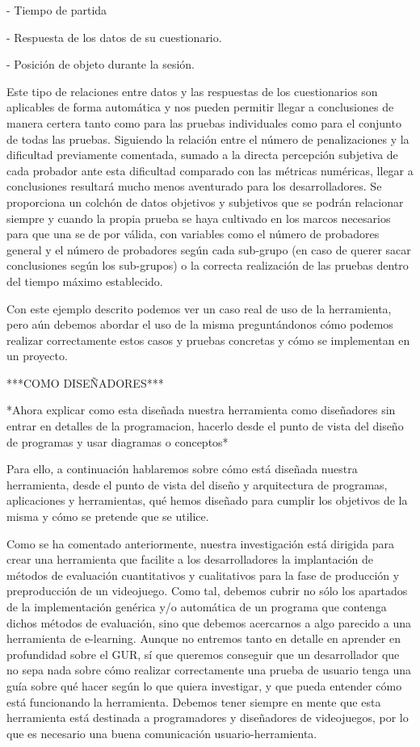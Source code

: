 - Tiempo de partida

- Respuesta de los datos de su cuestionario.

- Posición de objeto durante la sesión.


Este tipo de relaciones entre datos y las respuestas de los cuestionarios son aplicables de forma automática y nos pueden permitir llegar a conclusiones de manera certera tanto como para las pruebas individuales como para el conjunto de todas las pruebas. Siguiendo la relación entre el número de penalizaciones y la dificultad previamente comentada, sumado a la directa percepción subjetiva de cada probador ante esta dificultad comparado con las métricas numéricas, llegar a conclusiones resultará mucho menos aventurado para los desarrolladores. Se proporciona un colchón de datos objetivos y subjetivos que se podrán relacionar siempre y cuando la propia prueba se haya cultivado en los marcos necesarios para que una se de por válida, con variables como el número de probadores general y el número de probadores según cada sub-grupo (en caso de querer sacar conclusiones según los sub-grupos) o la correcta realización de las pruebas dentro del tiempo máximo establecido.


Con este ejemplo descrito podemos ver un caso real de uso de la herramienta, pero aún debemos abordar el uso de la misma preguntándonos cómo podemos realizar correctamente estos casos y pruebas concretas y cómo se implementan en un proyecto.


***COMO DISEÑADORES***


*Ahora explicar como esta diseñada nuestra herramienta como diseñadores sin entrar en detalles de la programacion, hacerlo desde el punto de vista del diseño de programas y usar diagramas o conceptos*


Para ello, a continuación hablaremos sobre cómo está diseñada nuestra herramienta, desde el punto de vista del diseño y arquitectura de programas, aplicaciones y herramientas, qué hemos diseñado para cumplir los objetivos de la misma y cómo se pretende que se utilice. 


Como se ha comentado anteriormente, nuestra investigación está dirigida para crear una herramienta que facilite a los desarrolladores la implantación de métodos de evaluación cuantitativos y cualitativos para la fase de producción y preproducción de un videojuego. Como tal, debemos cubrir no sólo los apartados de la implementación genérica y/o automática de un programa que contenga dichos métodos de evaluación, sino que debemos acercarnos a algo parecido a una herramienta de e-learning. Aunque no entremos tanto en detalle en aprender en profundidad sobre el GUR, sí que queremos conseguir que un desarrollador que no sepa nada sobre cómo realizar correctamente una prueba de usuario tenga una guía sobre qué hacer según lo que quiera investigar, y que pueda entender cómo está funcionando la herramienta. Debemos tener siempre en mente que esta herramienta está destinada a programadores y diseñadores de videojuegos, por lo que es necesario una buena comunicación usuario-herramienta. 


